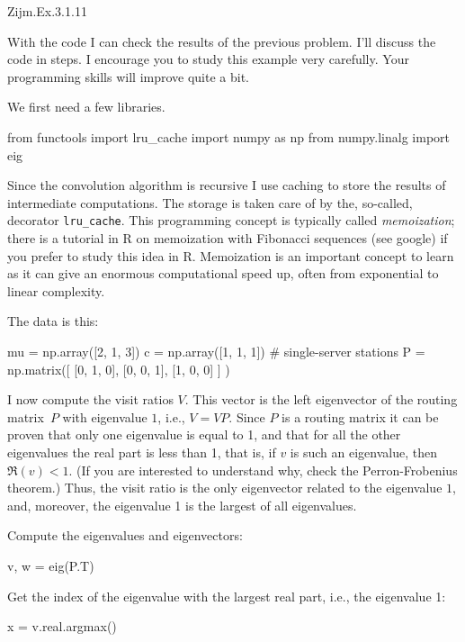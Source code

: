 \begin{exercise}
Zijm.Ex.3.1.11
\begin{solution}
 With the code I can check the results of the previous problem. I'll
 discuss the code in steps. I encourage you to study this example very carefully. Your
 programming skills will improve quite a bit. 

We first need a few libraries. 

\begin{pyconsole}
from functools import lru_cache
import numpy as np
from numpy.linalg import eig
 
\end{pyconsole}

Since the convolution algorithm is recursive I use caching to store
the results of intermediate computations. The storage is taken care of
by the, so-called, decorator \texttt{lru\_cache}. This programming
concept is typically called \emph{memoization}; there is a tutorial in
R on memoization with Fibonacci sequences (see google) if you prefer
to study this idea in R. Memoization is an important concept to learn
as it can give an enormous computational speed up, often from
exponential to linear complexity.

The data is this:

\begin{pyconsole}
mu = np.array([2, 1, 3])
c = np.array([1, 1, 1]) # single-server stations
P = np.matrix([
 [0, 1, 0],
 [0, 0, 1],
 [1, 0, 0]
]
)
 
\end{pyconsole}

I now compute the visit ratios $V$. This vector is the left
eigenvector of the routing matrix~$P$ with eigenvalue $1$, i.e.,
$V=VP$. Since $P$ is a routing matrix it can be proven that only one
eigenvalue is equal to 1, and that for all the other eigenvalues the
real part is less than 1, that is, if $v$ is such an eigenvalue, then
$\Re(v) < 1$. (If you are interested to understand why, check
the Perron-Frobenius theorem.) Thus, the visit ratio is the only
eigenvector related to the eigenvalue $1$, and, moreover, the
eigenvalue 1 is the largest of all eigenvalues.

Compute the eigenvalues and eigenvectors:

\begin{pyconsole}
v, w = eig(P.T)
\end{pyconsole}

Get the index of the eigenvalue with the largest real part, i.e., the eigenvalue 1:
\begin{pyconsole}
x = v.real.argmax() 
\end{pyconsole}


\end{solution}
\end{exercise}
